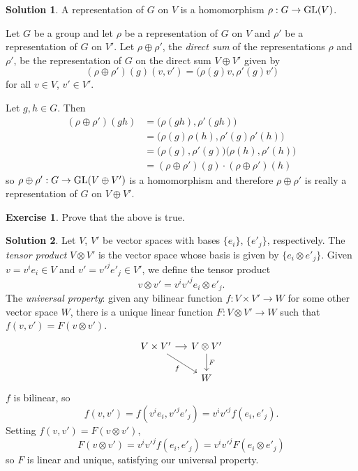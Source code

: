 \documentclass[11pt, a4paper]{report}
\theoremstyle{definition}
\newtheorem{exercise}{Exercise}[part]
\newtheorem{solution}{Solution}[part]
\newenvironment{ex}{\begin{exercise}}{\end{exercise}\pagebreak[1]}
\newenvironment{sol}{\begin{solution}}{\end{solution}\pagebreak[3]}
\newcommand*{\GL}{\ensuremath\text{GL}}
\begin{document}
\begin{sol}

A representation of $G$ on $V$ is a homomorphism $\rho: G \to \GL(V)$.

Let $G$ be a group and let $\rho$ be a representation of $G$ on $V$ and $\rho'$ be a representation of $G$ on $V'$.
Let $\rho \oplus \rho'$, the \emph{direct sum} of the representations $\rho$ and $\rho'$, be the representation of $G$ on the direct sum $V \oplus V'$ given by
\[
    (\rho \oplus \rho')(g)(v, v') = \bigl( \rho(g) v, \rho'(g) v' \bigr)
\]
for all $v \in V$, $v' \in V'$.

Let $g, h \in G$. Then
\begin{align*}
    (\rho \oplus \rho')(gh) &= \bigl( \rho(gh), \rho'(gh) \bigr) \\
        &= \bigl( \rho(g) \rho(h), \rho'(g) \rho'(h) \bigr) \\
        &= \bigl( \rho(g), \rho'(g) \bigr) \bigl( \rho(h), \rho'(h) \bigr) \\
        &= (\rho \oplus \rho')(g) \cdot (\rho \oplus \rho')(h)
\end{align*}
so $\rho \oplus \rho': G \to \GL(V \oplus V')$ is a homomorphism and therefore $\rho \oplus \rho'$ is really a representation of $G$ on $V \oplus V'$.

\end{sol}

\begin{ex}

Prove that the above is true.

\end{ex}

\begin{sol}

Let $V$, $V'$ be vector spaces with bases $\{e_i\}$, $\{e'_j\}$, respectively.
The \emph{tensor product} $V \otimes V'$ is the vector space whose basis is given by $\{e_i \otimes e'_j\}$.
Given $v = v^i e_i \in V$ and $v' = v'^j e'_j \in V'$, we define the tensor product
\[
    v \otimes v' = v^i v'^j e_i \otimes e'_j.
\]
The \emph{universal property}: given any bilinear function $f: V \times V' \to W$ for some other vector space $W$, there is a unique linear function $F: V \otimes V' \to W$ such that $f(v, v') = F(v \otimes v')$.
\[
    \begin{tikzcd}[column sep=small]
        V \times V' \rar{} \drar[swap]{f} & V \otimes V' \dar{F} \\
                                          & W
    \end{tikzcd}
\]
$f$ is bilinear, so
\[
    f(v, v') = f(v^i e_i, v'^j e'_j) = v^i v'^j f(e_i, e'_j).
\]
Setting $f(v, v') = F(v \otimes v')$,
\[
    F(v \otimes v') = v^i v'^j f(e_i, e'_j) = v^i v'^j F( e_i \otimes e'_j)
\]
so $F$ is linear and unique, satisfying our universal property.

\end{sol}
\end{document}
